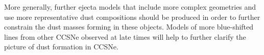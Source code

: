 More generally, further ejecta models that include more complex geometries and use  more representative dust  compositions should be produced in order to further constrain the dust masses forming in these objects. Models of more blue-shifted lines from other CCSNe observed at late times will help to further clarify the picture of dust formation in CCSNe.

%
% 

